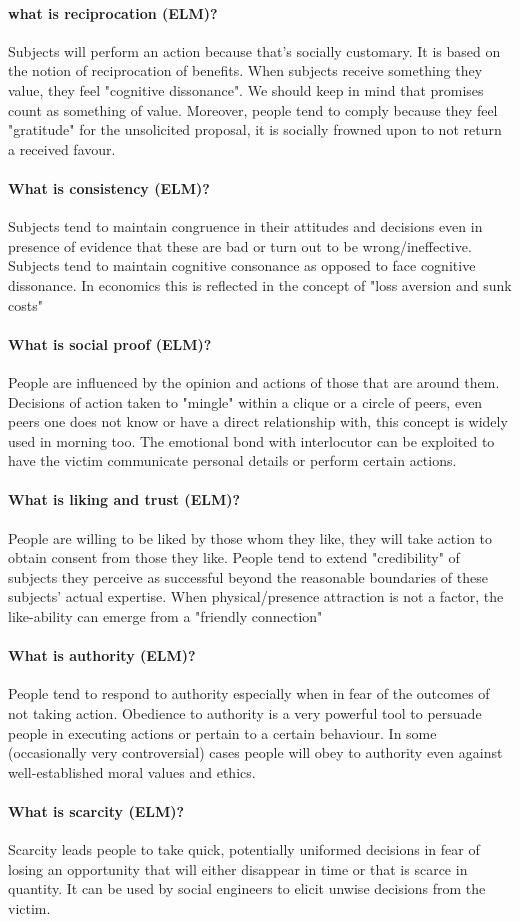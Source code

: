 \paragraph{what is reciprocation (ELM)?}
Subjects will perform an action because that's socially customary. It is based on the notion of reciprocation of benefits. When subjects receive something they value, they feel "cognitive dissonance". We should keep in mind that promises count as something of value. Moreover, people tend to comply because they feel "gratitude" for the unsolicited proposal, it is socially frowned upon to not return a received favour.

\paragraph{What is consistency (ELM)?}
Subjects tend to maintain congruence in their attitudes and decisions even in presence of evidence that these are bad or turn out to be wrong/ineffective. Subjects tend to maintain cognitive consonance as opposed to face cognitive dissonance. In economics this is reflected in the concept of "loss aversion and sunk costs"

\paragraph{What is social proof (ELM)?}
People are influenced by the opinion and actions of those that are around them. Decisions of action taken to "mingle" within a clique or a circle of peers, even peers one does not know or have a direct relationship with, this concept is widely used in morning too. The emotional bond with interlocutor can be exploited to have the victim communicate personal details or perform certain actions. 

\paragraph{What is liking and trust (ELM)?}
People are willing to be liked by those whom they like, they will take action to obtain consent from those they like. People tend to extend "credibility" of subjects they perceive as successful beyond the reasonable boundaries of these subjects' actual expertise. When physical/presence attraction is not a factor, the like-ability can emerge from a "friendly connection"

\paragraph{What is authority (ELM)?}
People tend to respond to authority especially when in fear of the outcomes of not taking action. Obedience to authority is a very powerful tool to persuade people in executing actions or pertain to a certain behaviour. In some (occasionally very controversial) cases people will obey to authority even against well-established moral values and ethics.

\paragraph{What is scarcity (ELM)?}
 Scarcity leads people to take quick, potentially uniformed decisions in fear of losing an opportunity that will either disappear in time or that is scarce in quantity. It can be used by social engineers to elicit unwise decisions from the victim. 